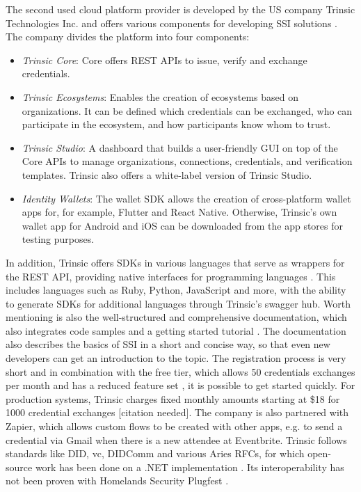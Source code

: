     The second used cloud platform provider is developed by the US company Trinsic Technologies Inc. and offers various components for developing SSI solutions \cite{trinsic_trinsic_2021}. The company divides the platform into four components:
    
    \begin{itemize}
        \item \textit{Trinsic Core}: Core offers REST APIs to issue, verify and exchange credentials. \cite{trinsic_trinsic_2021-1}
        \item \textit{Trinsic Ecosystems}: Enables the creation of ecosystems based on organizations. It can be defined which credentials can be exchanged, who can participate in the ecosystem, and how participants know whom to trust. \cite{trinsic_trinsic_2021-2}
        \item \textit{Trinsic Studio}: A dashboard that builds a user-friendly GUI on top of the Core APIs to manage organizations, connections, credentials, and verification templates. Trinsic also offers a white-label version of Trinsic Studio. \cite{trinsic_trinsic_2021-3}
        \item \textit{Identity Wallets}: The wallet SDK allows the creation of cross-platform wallet apps for, for example, Flutter and React Native. Otherwise, Trinsic's own wallet app for Android and iOS can be downloaded from the app stores for testing purposes. \cite{trinsic_identity_2021}
    \end{itemize}
    
    In addition, Trinsic offers SDKs in various languages that serve as wrappers for the REST API, providing native interfaces for programming languages \cite{trinsic_service_2021}. This includes languages such as Ruby, Python, JavaScript and more, with the ability to generate SDKs for additional languages through Trinsic's swagger hub. Worth mentioning is also the well-structured and comprehensive documentation, which also integrates code samples and a getting started tutorial \cite{trinsic_introduction_2021}. The documentation also describes the basics of SSI in a short and concise way, so that even new developers can get an introduction to the topic. The registration process is very short and in combination with the free tier, which allows 50 credentials exchanges per month and has a reduced feature set \cite{trinsic_pricing_2021}, it is possible to get started quickly. For production systems, Trinsic charges fixed monthly amounts starting at \$18 for 1000 credential exchanges [citation needed]. The company is also partnered with Zapier, which allows custom flows to be created with other apps, e.g. to send a credential via Gmail when there is a new attendee at Eventbrite. Trinsic follows standards like \ac{DID}, \ac{vc}, DIDComm and various Aries RFCs, for which open-source work has been done on a .NET implementation \cite{trinsic_open_2021}. Its interoperability has not been proven with Homelands Security Plugfest \cite{homeland_security_interoperability_2021}.
    
